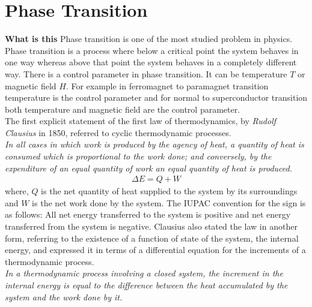 \chapter{Phase Transition}

\ifpdf
    \graphicspath{{Chapter3/Figs/thermodynamics/}{Chapter3/Figs/}}
\else
    \graphicspath{{Chapter3/Figs/thermodynamics/}{Chapter3/Figs/}}
\fi

\textbf{What is this}
Phase transition is one of the most studied problem in physics. Phase transition is a process where below a critical point the system behaves in one way whereas above that point the system behaves in a completely different way. There is a control parameter in phase transition. It can be temperature $T$ or magnetic field $H$. For example in ferromagnet to paramagnet transition temperature is the control parameter and for normal to superconductor transition both temperature and magnetic field are the control parameter.\\
The first explicit statement of the first law of thermodynamics, by \textit{Rudolf Clausius} in 1850, referred to cyclic thermodynamic processes. \\
\textit{In all cases in which work is produced by the agency of heat, a quantity of heat is consumed which is proportional to the work done; and conversely, by the expenditure of an equal quantity of work an equal quantity of heat is produced.}\\
\begin{align}
	\Delta E = Q + W
\end{align}
where, $Q$ is the net quantity of heat supplied to the system by its surroundings and $W$ is the net work done by the system.
The IUPAC convention for the sign is as follows: All net energy transferred to the system is positive and net energy transferred from the system is negative.
Clausius also stated the law in another form, referring to the existence of a function of state of the system, the internal energy, and expressed it in terms of a differential equation for the increments of a thermodynamic process.\\
\textit{In a thermodynamic process involving a closed system, the increment in the internal energy is equal to the difference between the heat accumulated by the system and the work done by it.}\\
